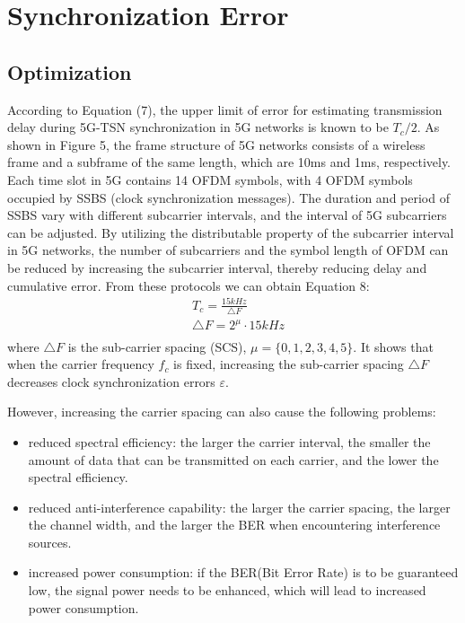\documentclass[english]{cccconf}
\begin{document}
{\section{Synchronization Error}

\subsection{Optimization}
According to Equation (7), the upper limit of error for estimating transmission delay during 5G-TSN synchronization in 5G networks is known to be $T_c/2$. As shown in Figure 5, the frame structure of 5G networks consists of a wireless frame and a subframe of the same length, which are 10ms and 1ms, respectively. Each time slot in 5G contains 14 OFDM symbols, with 4 OFDM symbols occupied by SSBS (clock synchronization messages). The duration and period of SSBS vary with different subcarrier intervals, and the interval of 5G subcarriers can be adjusted. By utilizing the distributable property of the subcarrier interval in 5G networks, the number of subcarriers and the symbol length of OFDM can be reduced by increasing the subcarrier interval, thereby reducing delay and cumulative error. From these protocols we can obtain Equation 8:
\begin{equation}
	\begin{split}
		&T_{c}=\frac{15kHz}{\triangle F}\\
		&\triangle F=2^\mu\cdot15kHz \\
	\end{split}	
\end{equation}
where $\triangle F$ is the sub-carrier spacing (SCS), $\mu=\{0,1,2,3,4,5\}$. It shows that when the carrier frequency $f_c$ is fixed, increasing the sub-carrier spacing $\triangle F$ decreases clock synchronization errors $\varepsilon$.

However, increasing the carrier spacing can also cause the following problems:
\begin{itemize}
	\item reduced spectral efficiency: the larger the carrier interval, the smaller the amount of data that can be transmitted on each carrier, and the lower the spectral efficiency.
	
	\item reduced anti-interference capability: the larger the carrier spacing, the larger the channel width, and the larger the BER when encountering interference sources.
	
	\item increased power consumption: if the BER(Bit Error Rate) is to be guaranteed low, the signal power needs to be enhanced, which will lead to increased power consumption.
	

\end{itemize}}
\end{document}
